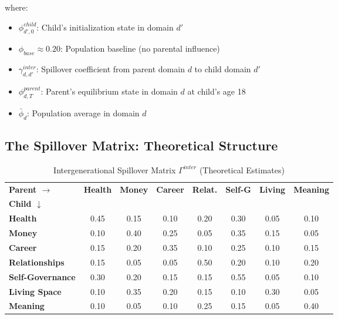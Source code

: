 where:
\begin{itemize}[nosep]
\item $\phi^{child}_{d',0}$: Child's initialization state in domain $d'$
\item $\phi_{base} \approx 0.20$: Population baseline (no parental influence)
\item $\gamma^{inter}_{d,d'}$: Spillover coefficient from parent domain $d$ to child domain $d'$
\item $\phi^{parent}_{d,T}$: Parent's equilibrium state in domain $d$ at child's age 18
\item $\bar{\phi}_d$: Population average in domain $d$
\end{itemize}

\subsection{The Spillover Matrix: Theoretical Structure}

\begin{table}[htbp]
\centering
\caption{Intergenerational Spillover Matrix $\Gamma^{inter}$ (Theoretical Estimates)}
\label{tab:BI-spillover}
\renewcommand{\arraystretch}{1.3}
\small
\begin{tabular}{@{}l|ccccccc@{}}
\toprule
\textbf{Parent $\rightarrow$} & \textbf{Health} & \textbf{Money} & \textbf{Career} & \textbf{Relat.} & \textbf{Self-G} & \textbf{Living} & \textbf{Meaning} \\
\textbf{Child $\downarrow$} & & & & & & & \\
\midrule
\textbf{Health} & \cellcolor{green!25}0.45 & 0.15 & 0.10 & 0.20 & \cellcolor{green!15}0.30 & 0.05 & 0.10 \\
\textbf{Money} & 0.10 & \cellcolor{green!25}0.40 & 0.25 & 0.05 & \cellcolor{green!15}0.35 & 0.15 & 0.05 \\
\textbf{Career} & 0.15 & 0.20 & \cellcolor{green!25}0.35 & 0.10 & 0.25 & 0.10 & 0.15 \\
\textbf{Relationships} & 0.15 & 0.05 & 0.05 & \cellcolor{green!25}0.50 & 0.20 & 0.10 & 0.20 \\
\textbf{Self-Governance} & \cellcolor{green!15}0.30 & 0.20 & 0.15 & 0.15 & \cellcolor{green!25}0.55 & 0.05 & 0.10 \\
\textbf{Living Space} & 0.10 & \cellcolor{green!15}0.35 & 0.20 & 0.15 & 0.10 & \cellcolor{green!25}0.30 & 0.05 \\
\textbf{Meaning} & 0.10 & 0.05 & 0.10 & 0.25 & 0.15 & 0.05 & \cellcolor{green!25}0.40 \\
\bottomrule
\end{tabular}
\end{table}

